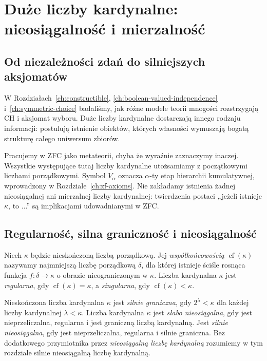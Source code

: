 \chapter{Duże liczby kardynalne: nieosiągalność i mierzalność}
\label{ch:large-cardinals}

\section{Od niezależności zdań do silniejszych aksjomatów}

W Rozdziałach~\ref{ch:constructible}, \ref{ch:boolean-valued-independence}
i~\ref{ch:symmetric-choice} badaliśmy, jak różne modele teorii
mnogości rozstrzygają CH i aksjomat wyboru. Duże liczby kardynalne
dostarczają innego rodzaju informacji: postulują istnienie obiektów,
których własności wymuszają bogatą strukturę całego uniwersum zbiorów.

Pracujemy w ZFC jako metateorii, chyba że wyraźnie zaznaczymy
inaczej. Wszystkie występujące tutaj liczby kardynalne utożsamiamy
z początkowymi liczbami porządkowymi. Symbol $V_\alpha$
oznacza $\alpha$-ty etap hierarchii kumulatywnej, wprowadzony
w Rozdziale~\ref{ch:zf-axioms}.
Nie zakładamy istnienia żadnej nieosiągalnej ani mierzalnej
liczby kardynalnej: twierdzenia postaci „jeżeli istnieje $\kappa$, to ...”
są implikacjami udowadnianymi w ZFC.

\section{Regularność, silna graniczność i nieosiągalność}

\begin{definicja}
\label{def:lc37-cofinality}
Niech $\kappa$ będzie nieskończoną liczbą porządkową.
Jej \emph{współkońcowością} $\operatorname{cf}(\kappa)$ nazywamy
najmniejszą liczbę porządkową $\delta$, dla której istnieje
ściśle rosnąca funkcja $f:\delta\to\kappa$ o obrazie
nieograniczonym w $\kappa$.
Liczba kardynalna $\kappa$ jest \emph{regularna},
gdy $\operatorname{cf}(\kappa)=\kappa$,
a \emph{singularna}, gdy $\operatorname{cf}(\kappa)<\kappa$.
\end{definicja}

\begin{definicja}
\label{def:lc37-inaccessible}
Nieskończona liczba kardynalna $\kappa$ jest \emph{silnie graniczna},
gdy $2^\lambda<\kappa$ dla każdej liczby kardynalnej $\lambda<\kappa$.
Liczba kardynalna $\kappa$ jest \emph{słabo nieosiągalna},
gdy jest nieprzeliczalna, regularna i jest graniczną
liczbą kardynalną. Jest \emph{silnie nieosiągalna},
gdy jest nieprzeliczalna, regularna i silnie graniczna.
Bez dodatkowego przymiotnika przez
\emph{nieosiągalną liczbę kardynalną} rozumiemy w tym rozdziale
silnie nieosiągalną liczbę kardynalną.
\end{definicja}

